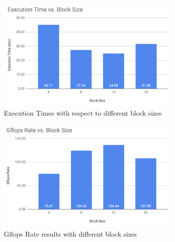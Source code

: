 \documentclass{article}
\begin{document}
\begin{figure}[!htb]
  \centering
  \begin{subfigure}{.45\textwidth}
      \centering
      \includegraphics[width=1\linewidth]{./img/execution-block.png}
      \caption{Execution Times with respect to different block sizes}
  \end{subfigure} 
  \begin{subfigure}{.45\textwidth}
      \centering
      \includegraphics[width=1\linewidth]{./img/gflops-block.png}
      \caption{Gflops Rate results with different block sizes}

  \end{subfigure}
  \caption{}
\end{figure} 
\end{document}
